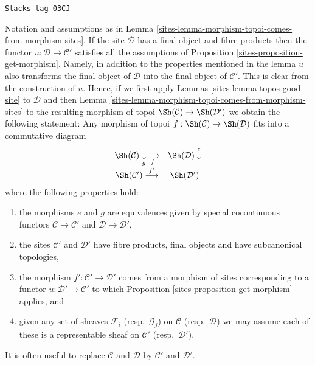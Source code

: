 \begin{remark}
\label{sites-remark-morphism-topoi-comes-from-morphism-sites}
\href{https://stacks.math.columbia.edu/tag/03CJ}{\texttt{Stacks tag 03CJ}}

Notation and assumptions
as in Lemma \ref{sites-lemma-morphism-topoi-comes-from-morphism-sites}.
If the site $\mathcal{D}$ has a final object and fibre products
then the functor $u : \mathcal{D} \to \mathcal{C}'$ satisfies
all the assumptions of Proposition \ref{sites-proposition-get-morphism}.
Namely, in addition to the properties mentioned in the lemma $u$
also transforms the final object of $\mathcal{D}$ into the final
object of $\mathcal{C}'$. This is clear from the construction of $u$.
Hence, if we first apply
Lemmas \ref{sites-lemma-topos-good-site}
to $\mathcal{D}$
and then
Lemma \ref{sites-lemma-morphism-topoi-comes-from-morphism-sites}
to the resulting morphism of topoi
$\Sh(\mathcal{C}) \to \Sh(\mathcal{D}')$
we obtain the following statement:
Any morphism of topoi
$f : \Sh(\mathcal{C}) \to \Sh(\mathcal{D})$
fits into a commutative diagram
$$
\begin{array}{cc}\Sh(\mathcal{C}) \underset{g}{\downarrow}\underset{f}{\longrightarrow} & \Sh(\mathcal{D}) \overset{e}{\downarrow} \\ \Sh(\mathcal{C}') \overset{f'}{\longrightarrow} & \Sh(\mathcal{D}')\end{array}
$$
where the following properties hold:
\begin{enumerate}
\item the morphisms $e$ and $g$ are equivalences given by
special cocontinuous functors $\mathcal{C} \to \mathcal{C}'$ and
$\mathcal{D} \to \mathcal{D}'$,
\item the sites $\mathcal{C}'$ and $\mathcal{D}'$ have fibre products, final
objects and have subcanonical topologies,
\item the morphism $f' : \mathcal{C}' \to \mathcal{D}'$ comes from a
morphism of sites corresponding to a functor
$u : \mathcal{D}' \to \mathcal{C}'$ to which
Proposition \ref{sites-proposition-get-morphism}
applies, and
\item given any set of sheaves $\mathcal{F}_i$ (resp.\ $\mathcal{G}_j$)
on $\mathcal{C}$ (resp.\ $\mathcal{D}$) we may assume each of these is
a representable sheaf on $\mathcal{C}'$ (resp.\ $\mathcal{D}'$).
\end{enumerate}
It is often useful to replace $\mathcal{C}$ and $\mathcal{D}$ by
$\mathcal{C}'$ and $\mathcal{D}'$.
\end{remark}


